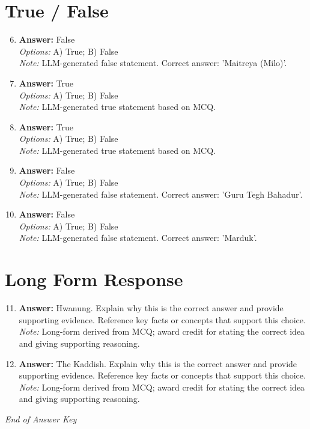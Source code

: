 \documentclass[12pt]{article}
\begin{document}
\section*{True / False}
\begin{enumerate}[label=\arabic*.]
\setcounter{enumi}{5}
\item \textbf{Answer:} False
\\ \textit{Options:} A) True; B) False
\\ \textit{Note:} LLM-generated false statement. Correct answer: 'Maitreya (Milo)'.
\item \textbf{Answer:} True
\\ \textit{Options:} A) True; B) False
\\ \textit{Note:} LLM-generated true statement based on MCQ.
\item \textbf{Answer:} True
\\ \textit{Options:} A) True; B) False
\\ \textit{Note:} LLM-generated true statement based on MCQ.
\item \textbf{Answer:} False
\\ \textit{Options:} A) True; B) False
\\ \textit{Note:} LLM-generated false statement. Correct answer: 'Guru Tegh Bahadur'.
\item \textbf{Answer:} False
\\ \textit{Options:} A) True; B) False
\\ \textit{Note:} LLM-generated false statement. Correct answer: 'Marduk'.
\end{enumerate}

\section*{Long Form Response}
\begin{enumerate}[label=\arabic*.]
\setcounter{enumi}{10}
\item \textbf{Answer:} Hwanung. Explain why this is the correct answer and provide supporting evidence. Reference key facts or concepts that support this choice.
\\ \textit{Note:} Long-form derived from MCQ; award credit for stating the correct idea and giving supporting reasoning.
\item \textbf{Answer:} The Kaddish. Explain why this is the correct answer and provide supporting evidence. Reference key facts or concepts that support this choice.
\\ \textit{Note:} Long-form derived from MCQ; award credit for stating the correct idea and giving supporting reasoning.
\end{enumerate}

\vfill
\noindent\textit{End of Answer Key}
\end{document}

